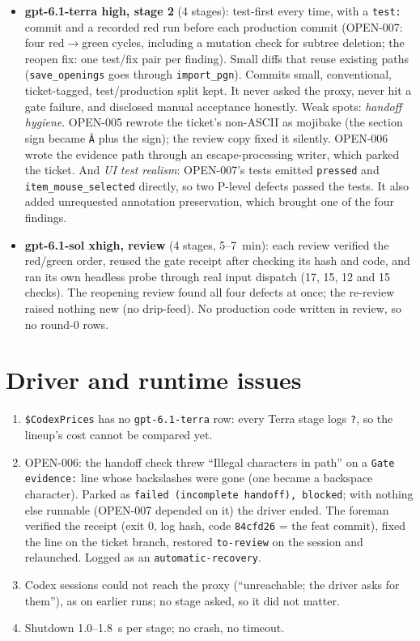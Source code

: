 \documentclass[11pt,a4paper]{article}
\begin{document}
\begin{itemize}
  \item \textbf{gpt-6.1-terra high, stage 2} (4 stages): test-first every time, with a
        \texttt{test:} commit and a recorded red run before each production commit (OPEN-007:
        four red$\to$green cycles, including a mutation check for subtree deletion; the reopen
        fix: one test/fix pair per finding). Small diffs that reuse existing paths
        (\texttt{save\_openings} goes through \texttt{import\_pgn}). Commits small, conventional,
        ticket-tagged, test/production split kept. It never asked the proxy, never hit a gate
        failure, and disclosed manual acceptance honestly.
        Weak spots: \emph{handoff hygiene}. OPEN-005 rewrote the ticket's non-ASCII as mojibake
        (the section sign became \texttt{Â} plus the sign); the review copy fixed it silently.
        OPEN-006 wrote the evidence path through an escape-processing writer, which parked the
        ticket. And \emph{UI test realism}: OPEN-007's tests emitted \texttt{pressed} and
        \texttt{item\_mouse\_selected} directly, so two P-level defects passed the tests. It also
        added unrequested annotation preservation, which brought one of the four findings.
  \item \textbf{gpt-6.1-sol xhigh, review} (4 stages, 5--7~min): each review verified the
        red/green order, reused the gate receipt after checking its hash and code, and ran its
        own headless probe through real input dispatch (17, 15, 12 and 15 checks). The reopening
        review found all four defects at once; the re-review raised nothing new (no drip-feed).
        No production code written in review, so no round-0 rows.
\end{itemize}

\section*{Driver and runtime issues}

\begin{enumerate}
  \item \texttt{\$CodexPrices} has no \texttt{gpt-6.1-terra} row: every Terra stage logs
        \texttt{?}, so the lineup's cost cannot be compared yet.
  \item OPEN-006: the handoff check threw ``Illegal characters in path'' on a
        \texttt{Gate evidence:} line whose backslashes were gone (one became a backspace
        character). Parked as \texttt{failed (incomplete handoff), blocked}; with nothing else
        runnable (OPEN-007 depended on it) the driver ended. The foreman verified the receipt
        (exit 0, log hash, code \texttt{84cfd26} = the feat commit), fixed the line on the ticket
        branch, restored \texttt{to-review} on the session and relaunched. Logged as an
        \texttt{automatic-recovery}.
  \item Codex sessions could not reach the proxy (``unreachable; the driver asks for them''), as
        on earlier runs; no stage asked, so it did not matter.
  \item Shutdown 1.0--1.8~s per stage; no crash, no timeout.
\end{enumerate}
\end{document}
